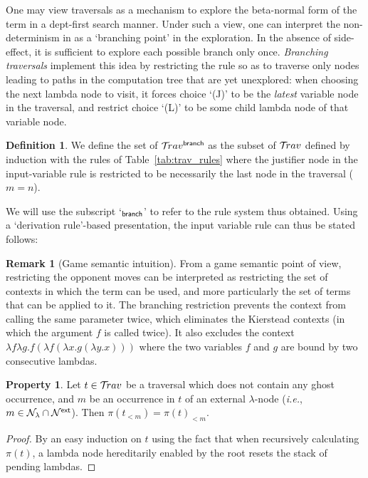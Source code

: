 \documentclass{article}
\makeatletter
\theoremstyle{definition}
\newtheorem{definition}{Definition}[section]
\newtheorem{property}{Property}[section]
\newtheorem{remark}{Remark}[section]
\newcommand\Nodes{\mathcal{N}}%
\newcommand\NodesVar{\Nodes_{\sf var}}%
\newcommand\NodesLmd{\Nodes_\lambda}%
\newcommand{\branching}{{\sf branch}}
\newcommand{\travsetbr}{{\travset^\branching}}
\newcommand{\travulc}{\travset}
\newcommand{\rulefont}[1]{\mathbf{\sf #1}}
\def\coresymbol{\pi} %
\newcommand{\core}[1]{\coresymbol(#1)} %
\newcommand{\enables}{\vdash} %
\newcommand{\ExtNodes}{\Nodes^{\sf ext}}
\renewcommand\ie{{\it i.e.\@\xspace}}
\makeatother
\begin{document}
One may view traversals as a mechanism to explore the beta-normal form of the term in a dept-first search manner. Under such a view, one can interpret the non-determinism in  as a `branching point' in the exploration. In the absence of side-effect, it is sufficient to explore each possible branch only once. \emph{Branching traversals} implement this idea by restricting the rule  so as to traverse only nodes leading to paths in the computation tree that are yet unexplored: when choosing the next lambda node to visit, it forces choice `(J)' to be the \emph{latest} variable node in the traversal, and restrict choice `(L)' to be some child lambda node of that variable node.

\begin{definition}
\label{dfn:branching_traversals}
We define the set of  $\travsetbr$ as the subset of $\travulc$ defined by induction with the rules of Table~\ref{tab:trav_rules} where the justifier node in the
input-variable rule  is restricted to be necessarily the last node in the traversal ($m=n$).

We will use the subscript `${}_\branching$' to refer to the rule system thus obtained. Using a `derivation rule'-based presentation, the input variable rule can thus be stated follows:
\infrule[$\rulefont{IVar_\branching}$]
     {t \cdot n \in\travsetbr
      \andalso n \in\ExtNodes\inter\NodesVar
      \andalso n \enables_i\alpha
      \andalso i \geq 1
     }
     { \in \travsetbr}
\end{definition}

\begin{remark}[Game semantic intuition]
From a game semantic point of view, restricting the opponent moves can be interpreted as restricting the set of contexts in which the term can be used, and more particularly the set of terms that can be applied to it.
The branching restriction prevents the context from calling the same parameter twice, which eliminates the Kierstead contexts (in which the argument $f$ is called twice). It also excludes the context $\lambda f \lambda g . f (\lambda f (\lambda x . g (\lambda y . x)))$ where the two variables $f$ and $g$ are bound by two consecutive lambdas.
\end{remark}

\begin{property}
\label{prop:core_truncation_at_externallambda}
Let $t\in\travulc$ be a traversal which does not contain any ghost occurrence, and $m$ be an occurrence in $t$ of an external $\lambda$-node (\ie, $m \in \NodesLmd\inter\ExtNodes$). Then $\core{t_{<m}} = \core{t}_{<m}$.
\end{property}
\begin{proof}
By an easy induction on $t$ using the fact that when recursively calculating $\coresymbol(t)$, a lambda node hereditarily enabled by the root resets the stack of pending lambdas.
\end{proof}
\end{document}
